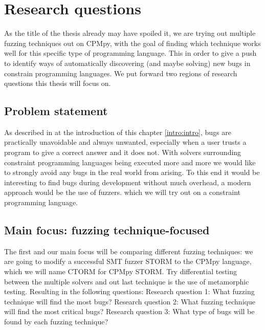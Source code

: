 \section{Research questions}
\label{intro:RQ:RQ's}
As the title of the thesis already may have spoiled it, we are trying out multiple fuzzing techniques out on CPMpy, with the goal of finding which technique works well for this specific type of programming language. This in order to give a push to identify ways of automatically discovering (and maybe solving) new bugs in constrain programming languages. We put forward two regions of research questions this thesis will focus on.

\subsection{Problem statement}
\label{intro:ProblemStatment}
As described in at the introduction of  this chapter \ref{intro:intro}, bugs are practically unavoidable and always unwanted, especially when a user trusts a program to give a correct answer and it does not. With solvers surrounding constraint programming languages being executed more and more we would like to strongly avoid any bugs in the real world from arising. To this end it would be interesting to find bugs during development without much overhead, a modern approach would be the use of fuzzers. which we will try out on a constraint programming language.

\subsection{Main focus: fuzzing technique-focused}
\label{intro:RQ:MainFocus}
The first and our main focus will be comparing different fuzzing techniques: we are going to modify a successful SMT fuzzer STORM to the CPMpy language, which we will name CTORM for CPMpy STORM. Try differential testing between the multiple solvers and out last technique is the use of metamorphic testing. Resulting in the following questions: \newline
Research question 1: What fuzzing technique will find the most bugs? \newline 
Research question 2: What fuzzing technique will find the most critical bugs? \newline
Research question 3: What type of bugs will be found by each fuzzing technique? \newline

